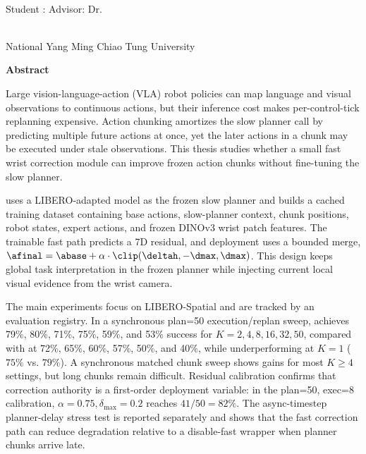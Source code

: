 \begin{center}
    \large

    \begin{singlespace}
        \textbf{\englishTitle{}} \\[0.5cm]
    \end{singlespace}

    \begin{singlespace}
        Student : \studentEnName{}  \hspace{1.0cm}
        Advisor: Dr.\, \advisorEnName \\
    \end{singlespace}

    \vspace{0.5cm}
    \begin{singlespace}
        \NameofDepartmentInstituteEN\\
        National Yang Ming Chiao Tung University\\[0.2cm]
    \end{singlespace}

    \textbf{Abstract} \\[0.5cm]

\end{center}

\normalsize

Large vision-language-action (VLA) robot policies can map language and visual observations to continuous actions, but their inference cost makes per-control-tick replanning expensive. Action chunking amortizes the slow planner call by predicting multiple future actions at once, yet the later actions in a chunk may be executed under stale observations. This thesis studies whether a small fast wrist correction module can improve frozen \smolvla{} action chunks without fine-tuning the slow planner.

\method{} uses a LIBERO-adapted \smolvla{} model as the frozen slow planner and builds a cached training dataset containing base actions, slow-planner context, chunk positions, robot states, expert actions, and frozen DINOv3 wrist patch features. The trainable fast path predicts a 7D residual, and deployment uses a bounded merge, $\afinal=\abase+\alpha\cdot\clip(\deltah,-\dmax,\dmax)$. This design keeps global task interpretation in the frozen planner while injecting current local visual evidence from the wrist camera.

The main experiments focus on LIBERO-Spatial and are tracked by an evaluation registry. In a synchronous plan=50 execution/replan sweep, \method{} achieves 79\%, 80\%, 71\%, 75\%, 59\%, and 53\% success for $K=2,4,8,16,32,50$, compared with \smolvla{} at 72\%, 65\%, 60\%, 57\%, 50\%, and 40\%, while underperforming at $K=1$ ($75\%$ vs. $79\%$). A synchronous matched chunk sweep shows gains for most $K\geq4$ settings, but long chunks remain difficult. Residual calibration confirms that correction authority is a first-order deployment variable: in the plan=50, exec=8 calibration, $\alpha=0.75,\delta_{\max}=0.2$ reaches $41/50=82\%$. The async-timestep planner-delay stress test is reported separately and shows that the fast correction path can reduce degradation relative to a disable-fast wrapper when planner chunks arrive late.

